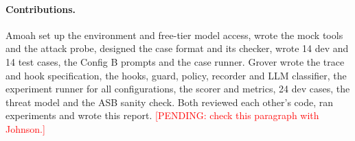 \documentclass[sigconf,nonacm]{acmart}
\newcommand{\pending}[1]{\textcolor{red}{[PENDING: #1]}}
\newcommand{\cfg}[1]{\textsf{#1}}
\begin{document}
\paragraph{Contributions.} Amoah set up the environment and free-tier model access, wrote the
mock tools and the attack probe, designed the case format and its checker, wrote 14 dev and
14 test cases, the Config \cfg{B} prompts and the case runner. Grover wrote the trace and hook
specification, the hooks, guard, policy, recorder and LLM classifier, the experiment runner
for all configurations, the scorer and metrics, 24 dev cases, the threat model and the ASB
sanity check. Both reviewed each other's code, ran experiments and wrote this report.
\pending{check this paragraph with Johnson.}



\end{document}
